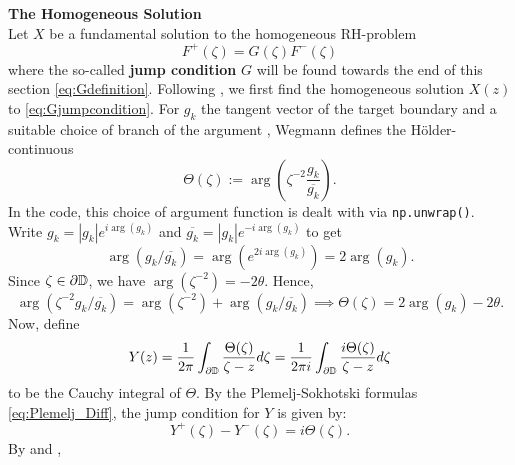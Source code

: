 \bigskip\noindent\textbf{The Homogeneous Solution}\\
Let $X$ be a fundamental solution to the homogeneous RH-problem \cite[§ 40]{Muskhelishvili1977}
\begin{equation}\label{eq:Gjumpcondition}
    F^+(\zeta) = G(\zeta) F^-(\zeta)
\end{equation}
where the so-called \textbf{jump condition} $G$ will be found towards the end of this section \eqref{eq:Gdefinition}.
Following \cite[§ 89, page 99ff]{Muskhelishvili1977}, we first find the homogeneous solution $X(z)$ to \eqref{eq:Gjumpcondition}. 
For $g_k$ the tangent vector of the target boundary and a suitable choice of branch of the argument \cite[page 457]{Wegmann1978_newtonverfahren}, Wegmann defines the Hölder-continuous
\begin{equation}
    \Theta(\zeta) := \arg(\zeta^{-2} \frac{g_k} {\overline{g_k}} ).
\end{equation} 
In the code, this choice of argument function is dealt with via \texttt{np.unwrap()}.
Write $g_k = |g_k|e^{i\arg(g_k)}$ and $\overline{g_k}=|g_k|e^{-i\arg(g_k)}$ to get
\begin{equation}
    \arg(g_k/\overline{g_k})=\arg(e^{2i\arg(g_k)})=2\arg(g_k).
\end{equation}
Since $\zeta\in\partial\mathbb{D}$, we have $\arg(\zeta^{-2})=-2\theta$.
Hence,
\begin{equation}
    \arg(\zeta^{-2} g_k/\overline{g_k})=\arg(\zeta^{-2})+\arg(g_k/\overline{g_k}) 
    \implies \Theta(\zeta) = 2\arg(g_k) - 2\theta.
\end{equation}
Now, define \cite[Eq. 3.5]{Wegmann1978_newtonverfahren}
\begin{equation} \label{eq:Yintegral}
    Y(z) = \frac{1}{2\pi} \displaystyle\int_{\partial\mathbb{D}} \frac{\Theta(\zeta)}{\zeta - z} d\zeta = \frac{1}{2\pi i} \displaystyle\int_{\partial\mathbb{D}} \frac{i \Theta(\zeta)}{\zeta - z} d\zeta
\end{equation} 
to be the Cauchy integral of $\Theta$. By the Plemelj-Sokhotski formulas \eqref{eq:Plemelj_Diff}, the jump condition for $Y$ is given by:
\begin{equation}\label{eq:Yjumpcondition}
    Y^+(\zeta) - Y^-(\zeta) = i\Theta(\zeta).
\end{equation}
By \cite[Eq. 3.6]{Wegmann1978_newtonverfahren}and \cite[page 105]{Muskhelishvili1977},
